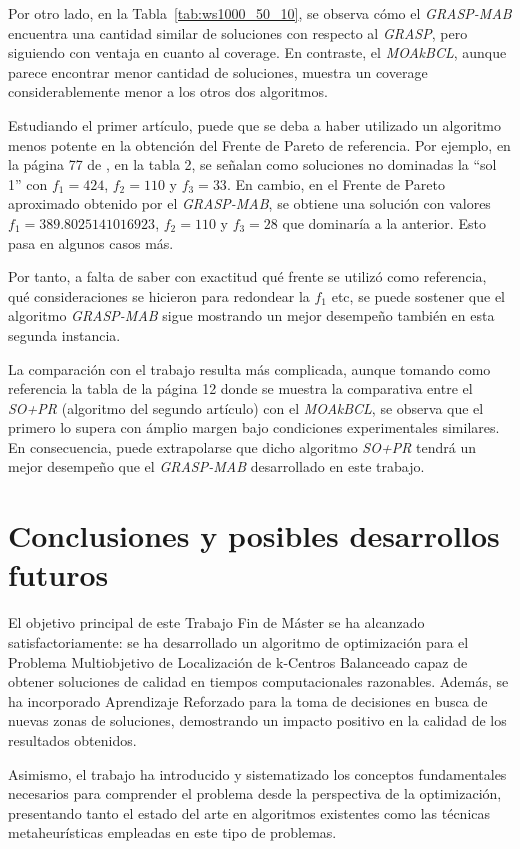 \documentclass[12pt,a4paper]{book}
\begin{document}
Por otro lado, en la Tabla~\ref{tab:ws1000_50_10}, se observa cómo el \textit{GRASP-MAB} encuentra una cantidad similar de soluciones con respecto al \textit{GRASP}, pero siguiendo con ventaja en cuanto al coverage.
En contraste, el \textit{MOAkBCL}, aunque parece encontrar menor cantidad de soluciones, muestra un coverage considerablemente menor a los otros dos algoritmos. 

Estudiando el primer artículo, puede que se deba a haber utilizado un algoritmo menos potente en la obtención del Frente de Pareto de referencia. Por ejemplo, en la página 77 de \cite{k-balanced_1}, en la tabla 2,
se señalan como soluciones no dominadas la ``sol 1'' con $f_1=424$, $f_2=110$ y $f_3=33$. En cambio, en el Frente de Pareto aproximado obtenido por el \textit{GRASP-MAB}, se obtiene una solución con valores $f_1=389.8025141016923$, $f_2=110$ y $f_3=28$ que dominaría a la anterior. Esto
pasa en algunos casos más.

Por tanto, a falta de saber con exactitud qué frente se utilizó como referencia, qué consideraciones se hicieron para redondear la $f_1$ etc, se puede sostener
que el algoritmo \textit{GRASP-MAB} sigue mostrando un mejor desempeño también en esta segunda instancia.

La comparación con el trabajo \cite{k-Balanced_2} resulta más complicada, aunque tomando como referencia la tabla de la página 12 donde se muestra la comparativa entre el \textit{SO+PR} (algoritmo del segundo artículo) con el \textit{MOAkBCL}, se observa que el primero lo supera con ámplio margen bajo
condiciones experimentales similares. En consecuencia, puede extrapolarse que dicho algoritmo \textit{SO+PR} tendrá un mejor desempeño que el \textit{GRASP-MAB} desarrollado en este trabajo.

\chapter{Conclusiones y posibles desarrollos futuros}
El objetivo principal de este Trabajo Fin de Máster se ha alcanzado satisfactoriamente: se ha desarrollado un algoritmo de optimización para el Problema Multiobjetivo de Localización de k-Centros Balanceado capaz de obtener soluciones de calidad en tiempos computacionales razonables. Además, se ha incorporado Aprendizaje Reforzado para la toma de decisiones en busca de nuevas zonas de soluciones,
demostrando un impacto positivo en la calidad de los resultados obtenidos.

Asimismo, el trabajo ha introducido y sistematizado los conceptos fundamentales necesarios para comprender el problema desde la perspectiva de la optimización, presentando tanto el estado del arte en algoritmos existentes como las técnicas metaheurísticas empleadas en este tipo de problemas.
\end{document}
